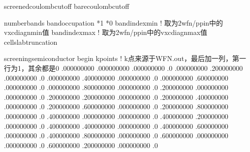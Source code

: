 \documentclass[a4paper,12pt,english]{sphinxmanual}
\begin{document}
\begin{sphinxVerbatim}[commandchars=\\\{\}]
screened\PYGZus{}coulomb\PYGZus{}cutoff 
bare\PYGZus{}coulomb\PYGZus{}cutoff 

number\PYGZus{}bands 
band\PYGZus{}occupation *1 *0
band\PYGZus{}index\PYGZus{}min    ! 取为2\PYGZhy{}wfn/pp\PYGZus{}in中的vxc\PYGZus{}diag\PYGZus{}nmin值
band\PYGZus{}index\PYGZus{}max   ! 取为2\PYGZhy{}wfn/pp\PYGZus{}in中的vxc\PYGZus{}diag\PYGZus{}nmax值
cell\PYGZus{}slab\PYGZus{}truncation

screening\PYGZus{}semiconductor
begin kpoints ! k点来源于WFN.out，最后加一列，第一行为1，其余都是0
  .000000000  .000000000  .000000000   .0 
  .000000000  .200000000  .000000000   .0 
  .000000000  .400000000  .000000000   .0 
  .000000000  .600000000  .000000000   .0 
  .000000000  .800000000  .000000000   .0 
  .200000000  .000000000  .000000000   .0 
  .200000000  .200000000  .000000000   .0 
  .200000000  .400000000  .000000000   .0 
  .200000000  .600000000  .000000000   .0 
  .200000000  .800000000  .000000000   .0 
  .400000000  .000000000  .000000000   .0 
  .400000000  .200000000  .000000000   .0 
  .400000000  .400000000  .000000000   .0 
  .400000000  .600000000  .000000000   .0 
  .400000000  .800000000  .000000000   .0 
  .600000000  .000000000  .000000000   .0 
  .600000000  .200000000  .000000000   .0 

\end{sphinxVerbatim}
\end{document}
